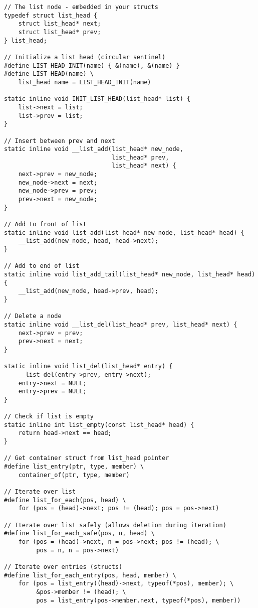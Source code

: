 \begin{lstlisting}
// The list node - embedded in your structs
typedef struct list_head {
    struct list_head* next;
    struct list_head* prev;
} list_head;

// Initialize a list head (circular sentinel)
#define LIST_HEAD_INIT(name) { &(name), &(name) }
#define LIST_HEAD(name) \
    list_head name = LIST_HEAD_INIT(name)

static inline void INIT_LIST_HEAD(list_head* list) {
    list->next = list;
    list->prev = list;
}

// Insert between prev and next
static inline void __list_add(list_head* new_node,
                              list_head* prev,
                              list_head* next) {
    next->prev = new_node;
    new_node->next = next;
    new_node->prev = prev;
    prev->next = new_node;
}

// Add to front of list
static inline void list_add(list_head* new_node, list_head* head) {
    __list_add(new_node, head, head->next);
}

// Add to end of list
static inline void list_add_tail(list_head* new_node, list_head* head) {
    __list_add(new_node, head->prev, head);
}

// Delete a node
static inline void __list_del(list_head* prev, list_head* next) {
    next->prev = prev;
    prev->next = next;
}

static inline void list_del(list_head* entry) {
    __list_del(entry->prev, entry->next);
    entry->next = NULL;
    entry->prev = NULL;
}

// Check if list is empty
static inline int list_empty(const list_head* head) {
    return head->next == head;
}

// Get container struct from list_head pointer
#define list_entry(ptr, type, member) \
    container_of(ptr, type, member)

// Iterate over list
#define list_for_each(pos, head) \
    for (pos = (head)->next; pos != (head); pos = pos->next)

// Iterate over list safely (allows deletion during iteration)
#define list_for_each_safe(pos, n, head) \
    for (pos = (head)->next, n = pos->next; pos != (head); \
         pos = n, n = pos->next)

// Iterate over entries (structs)
#define list_for_each_entry(pos, head, member) \
    for (pos = list_entry((head)->next, typeof(*pos), member); \
         &pos->member != (head); \
         pos = list_entry(pos->member.next, typeof(*pos), member))
\end{lstlisting}


